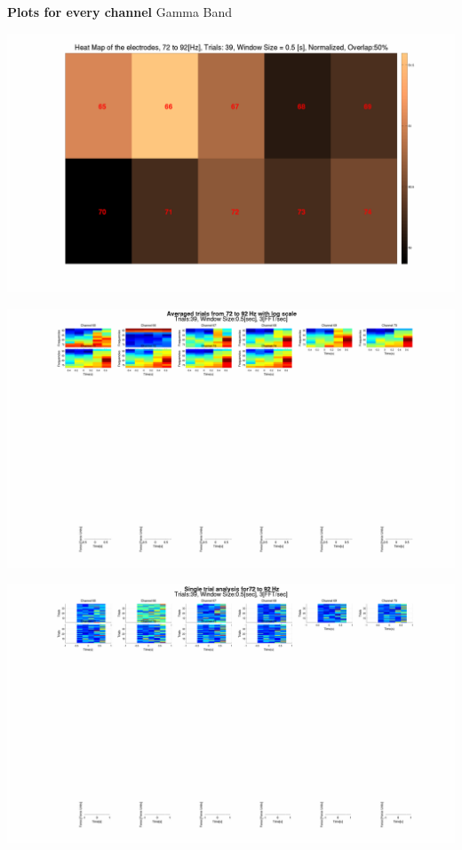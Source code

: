 \documentclass[12pt]{article}
\begin{document}
\newpage
\begin{center}
\textbf{Plots for every channel}
Gamma Band
\end{center}

\includegraphics[scale=0.1]{normalized_analysis_electrode_heatmap72_to_92.png}

\includegraphics[scale=0.1]{log_72_to_92_all_average_channel.png}

\includegraphics[scale=0.1]{log_72_to_92_all_single_trial_channel.png}
\end{document}
